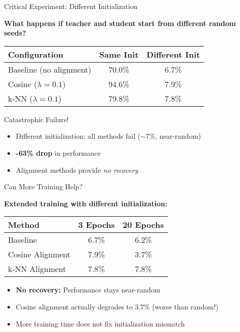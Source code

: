 \documentclass{beamer}
\begin{document}
\begin{frame}{Critical Experiment: Different Initialization}

\textbf{What happens if teacher and student start from different random seeds?}

\vspace{1em}

\begin{table}
\centering
\begin{tabular}{lcc}
\toprule
Configuration & Same Init & Different Init \\
\midrule
Baseline (no alignment) & 70.0\% & \alert{6.7\%} \\
Cosine ($\lambda=0.1$) & 94.6\% & \alert{7.9\%} \\
k-NN ($\lambda=0.1$) & 79.8\% & \alert{7.8\%} \\
\bottomrule
\end{tabular}
\end{table}

\vspace{1em}

\begin{alertblock}{Catastrophic Failure!}
\begin{itemize}
    \item Different initialization: all methods fail ($\sim$7\%, near-random)
    \item \textbf{-63\% drop} in performance
    \item Alignment methods provide \emph{no recovery}
\end{itemize}
\end{alertblock}

\end{frame}

\begin{frame}{Can More Training Help?}

\textbf{Extended training with different initialization:}

\vspace{1em}

\begin{table}
\centering
\begin{tabular}{lcc}
\toprule
Method & 3 Epochs & 20 Epochs \\
\midrule
Baseline & 6.7\% & 6.2\% \\
Cosine Alignment & 7.9\% & \alert{3.7\%} \\
k-NN Alignment & 7.8\% & 7.8\% \\
\bottomrule
\end{tabular}
\end{table}

\vspace{1em}

\begin{itemize}
    \item \textbf{No recovery:} Performance stays near-random
    \item \alert{Cosine alignment actually degrades to 3.7\%} (worse than random!)
    \item More training time does not fix initialization mismatch
\end{itemize}

\end{frame}
\end{document}
